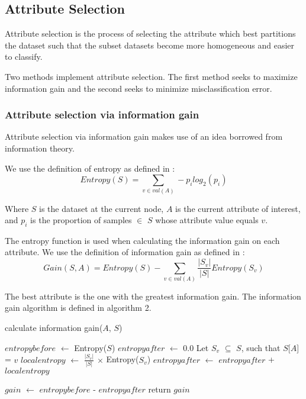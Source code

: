\documentclass{IEEEtran}
\begin{document}
\subsection{Attribute Selection}
Attribute selection is the process of selecting the attribute which
best partitions the dataset such that the subset datasets become more
homogeneous and easier to classify.

Two methods implement attribute selection. The first method seeks to
maximize information gain and the second seeks to minimize
misclassification error.

\subsubsection{Attribute selection via information gain}
Attribute selection via information gain makes use of an idea borrowed
from information theory.

We use the definition of entropy as defined
in \parencite{mitchell1997machine}:
\begin{equation}
\label{entropy-equation}
Entropy(S) = \sum_{v\in val(A)}-p_ilog_2(p_i)
\end{equation}

Where $S$ is the dataset at the current node, $A$ is the current
attribute of interest, and $p_i$ is the proportion of samples $\in$ $S$
whose attribute value equals $v$.

The entropy function is used when calculating the information gain on
each attribute. We use the definition of information gain as defined
in \parencite{mitchell1997machine}:
\begin{equation}
\label{information-gain-equation}
Gain(S,A) = Entropy(S) -\sum_{v \in val(A)}\frac{|S_v|}{|S|}Entropy(S_v)
\end{equation}

The best attribute is the one with the greatest information gain. The
information gain algorithm is defined in algorithm 2.

\begin{algorithm}
\caption{calculate information gain($A$, $S$)}
\begin{algorithmic}
\Statex{}
\State $entropybefore$ $\leftarrow$ Entropy($S$)
\State $entropyafter$ $\leftarrow$ 0.0
  \State Let $S_v$ $\subseteq$ $S$, such that $S$[$A$] = $v$
  \State $localentropy$ $\leftarrow$ $\frac{|S_v|}{|S|}$ $\times$ Entropy($S_v$)
  \State $entropyafter$ $\leftarrow$ $entropyafter$ + $localentropy$
\EndFor

\State $gain$ $\leftarrow$ $entropybefore$ - $entropyafter$
\State return $gain$
\end{algorithmic}
\end{algorithm}
\end{document}
